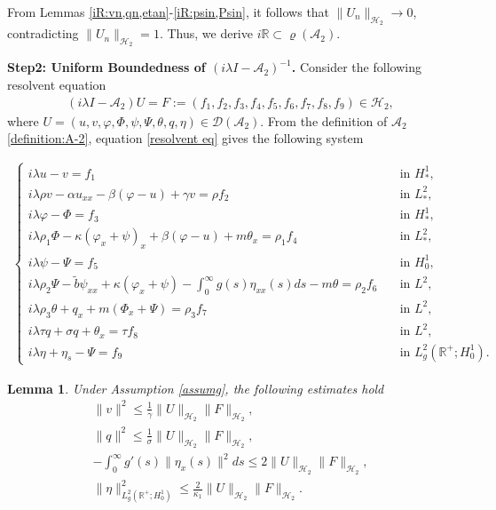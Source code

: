 \documentclass[11pt,reqno]{article}
\newtheorem{lemma}[theorem]{Lemma}
\newcommand{\dt}{\tilde}
\begin{document}
From Lemmas \ref{iR:vn,qn,etan}-\ref{iR:psin,Psin}, it follows that $\|U_n\|_{\mathcal{H}_2} \to 0$, contradicting $\|U_n\|_{\mathcal{H}_2} = 1$. Thus, we derive $i \mathbb{R} \subset \varrho(\mathcal{A}_2)$.

\textbf{Step2: Uniform Boundedness of $(i\lambda I-\mathcal{A}_2)^{-1}$.} Consider the following resolvent equation
\begin{align}\label{resolvent eq}
	(i\lambda I-\mathcal{A}_2)U=F := (f_1,f_2,f_3,f_4,f_5,f_6,f_7,f_8,f_9) \in \mathcal{H}_2,
\end{align}
where $U=(u,v,\varphi,\Phi,\psi,\Psi,\theta,q,\eta) \in \mathcal{D}(\mathcal{A}_2)$. From the definition of $\mathcal{A}_2$ \eqref{definition:A-2}, equation \eqref{resolvent eq} gives the following system

\begin{align}\label{Resolvent equations-2}
	\begin{cases}
		i\lambda u - v=f_1   \quad &\text{in } H_*^1,\\
		i\lambda \rho v -\alpha u_{xx}-\beta(\varphi - u)+ \gamma v =\rho f_2 \quad &\text{in } L_*^2,\\
		i\lambda\varphi - \Phi =f_3\quad &\text{in } H_*^1,\\
		i\lambda\rho_1 \Phi - \kappa(\varphi_{x}+\psi)_x + \beta (\varphi - u) +  m\theta_{x}=\rho_1f_4  \quad &\text{in } L_*^2,\\
		i\lambda \psi - \Psi =f_5 \quad &\text{in } H_0^1,\\
		i\lambda \rho_2 \Psi - \dt b \psi_{xx} + \kappa(\varphi_{x} + \psi) - \int_{0}^{\infty} g(s) \eta_{xx}(s) ds - m\theta =\rho_2f_6 \quad &\text{in } L^2,\\
		i\lambda \rho_3 \theta + q_x + m(\Phi_{x} + \Psi) =\rho_3f_7 \quad &\text{in } L^2,\\
		i\lambda \tau q + \sigma q + \theta_x = \tau f_8 \quad &\text{in } L^2, \\
		i\lambda \eta + \eta_s - \Psi=f_9 \quad &\text{in } L_g^2(\mathbb{R}^+;H_0^1).
	\end{cases}
\end{align}
\begin{lemma}\label{boundedness:v,q,eta}
	Under Assumption \ref{assumg}, the following estimates hold
	\begin{align}
		\|v\|^2 \leq \frac{1}{\gamma}\|U\|_{\mathcal{H}_2}\|F\|_{\mathcal{H}_2}, \label{v}\\
		\|q\|^2 \leq \frac{1}{\sigma}\|U\|_{\mathcal{H}_2}\|F\|_{\mathcal{H}_2}, \label{q}\\
		-\int_{0}^{\infty}g'(s)\|\eta_x(s)\|^2ds \leq 2\|U\|_{\mathcal{H}_2}\|F\|_{\mathcal{H}_2},\label{g'}\\
		\|\eta\|_{L_g^2(\mathbb{R}^+; H_0^1) }^2 \leq \frac{2}{\kappa_1}\|U\|_{\mathcal{H}_2}\|F\|_{\mathcal{H}_2}.\label{g}
	\end{align}
\end{lemma}
\end{document}
